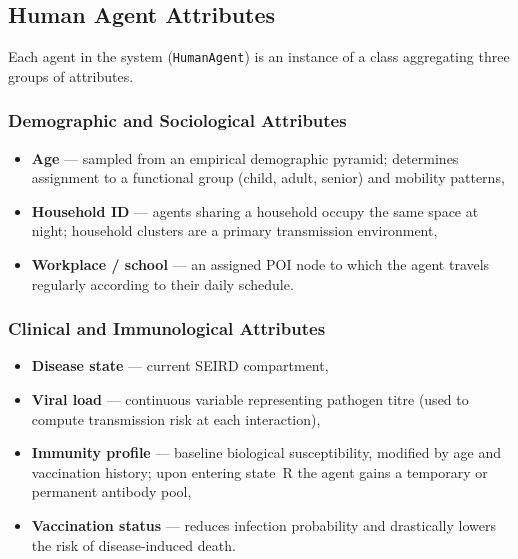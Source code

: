 \documentclass[english]{projectreport}
\begin{document}
\subsection{Human Agent Attributes}
\label{sec:agent-attributes}

Each agent in the system (\texttt{HumanAgent}) is an instance of a class
aggregating three groups of attributes.

\subsubsection{Demographic and Sociological Attributes}
\label{sec:demo-attrs}

\begin{itemize}
  \item \textbf{Age} --- sampled from an empirical demographic pyramid;
        determines assignment to a functional group (child, adult, senior)
        and mobility patterns,
  \item \textbf{Household ID} --- agents sharing a household occupy the same
        space at night; household clusters are a primary transmission
        environment,
  \item \textbf{Workplace / school} --- an assigned POI node to which the
        agent travels regularly according to their daily schedule.
\end{itemize}

\subsubsection{Clinical and Immunological Attributes}
\label{sec:clinical-attrs}

\begin{itemize}
  \item \textbf{Disease state} --- current SEIRD compartment,
  \item \textbf{Viral load} --- continuous variable representing pathogen
        titre (used to compute transmission risk at each interaction),
  \item \textbf{Immunity profile} --- baseline biological susceptibility,
        modified by age and vaccination history; upon entering state~R the
        agent gains a temporary or permanent antibody pool,
  \item \textbf{Vaccination status} --- reduces infection probability and
        drastically lowers the risk of disease-induced death.
\end{itemize}
\end{document}
